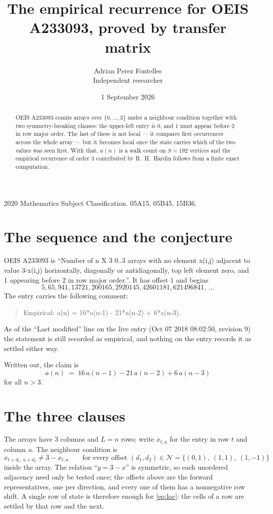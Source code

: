 \documentclass[11pt,a4paper]{article}
\title{The empirical recurrence for OEIS A233093, proved by transfer matrix}
\author{Adrian Perez Fontelles\\ \small Independent researcher}
\date{1 September 2026}
\theoremstyle{plain}
\theoremstyle{definition}
\begin{document}
\maketitle

\begin{abstract}
OEIS A233093 counts arrays over $\{0,\dots,3\}$ under a neighbour condition together with
two symmetry-breaking clauses: the upper-left entry is $0$, and $1$ must appear before
$2$ in row major order. The last of these is not local --- it compares first occurrences
across the whole array --- but it becomes local once the state carries which of the two values
was seen first. With that, $a(n)$ is a walk count on $S=192$ vertices and the empirical
recurrence of order $3$ contributed by R.~H.~Hardin follows from a finite exact
computation.
\end{abstract}

\noindent\small 2020 Mathematics Subject Classification. 05A15, 05B45, 15B36.\normalsize

\section{The sequence and the conjecture}

OEIS A233093 is ``Number of n X 3 0..3 arrays with no element x(i,j) adjacent to value 3-x(i,j) horizontally, diagonally or antidiagonally, top left element zero, and 1 appearing before 2 in row major order.''. It has offset $1$ and begins
\[
5, 65, 941, 13721, 200165, 2920145, 42601181, 621496841,\ \dots
\]
The entry carries the following comment:
\begin{quote}\small
Empirical: a(n) = 16*a(n-1) - 21*a(n-2) + 6*a(n-3).
\end{quote}
As of the ``Last modified'' line on the live entry (Oct 07 2018 08:02:50, revision 9) the statement is
still recorded as empirical, and nothing on the entry records it as settled either way.

Written out, the claim is
\begin{equation}\label{eq:conj}
a(n)\;=\;16\,a(n-1) - 21\,a(n-2) + 6\,a(n-3)
\end{equation}
for all $n>3$.

\section{The three clauses}

The arrays have $3$ columns and $L=n$ rows; write $x_{t,u}$ for the entry in
row $t$ and column $u$. The neighbour condition is
\begin{equation}\label{eq:loc}
x_{t+d_1,\,u+d_2}\ne 3-x_{t,u}\qquad\text{for every offset }(d_1,d_2)\in\mathcal N=\{(0,1),\ (1,1),\ (1,-1)\}
\end{equation}
inside the array. The relation ``$y=3-x$'' is symmetric, so each unordered adjacency need
only be tested once; the offsets above are the forward representatives, one per direction,
and every one of them has a nonnegative row shift. A single row of state is therefore
enough for \eqref{eq:loc}: the cells of a row are settled by that row and the next.
\end{document}
